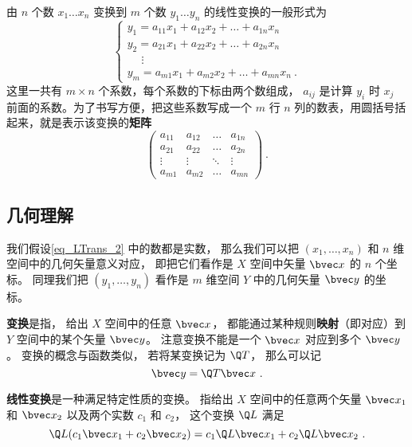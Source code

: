 由 $n$ 个数 $x_1 \ldots x_n$ 变换到 $m$ 个数 $y_1 \ldots y_n$ 的线性变换的一般形式为
\begin{equation}\label{eq_LTrans_2}
\begin{cases}
y_1 = a_{11} x_1 + a_{12} x_2 + \ldots + a_{1n} x_n\\
y_2 = a_{21} x_1 + a_{22} x_2 + \ldots + a_{2n} x_n\\
\quad\; \vdots \\
y_m = a_{m1} x_1 + a_{m2} x_2 + \ldots + a_{mn} x_n~.
\end{cases}
\end{equation} 
这里一共有 $m \times n$ 个系数，每个系数的下标由两个数组成， $a_{ij}$ 是计算 $y_i$ 时 $x_j$ 前面的系数。为了书写方便，把这些系数写成一个 $m$ 行 $n$ 列的数表，用圆括号括起来，就是表示该变换的\textbf{矩阵}
\begin{equation}\begin{pmatrix}
a_{11} & a_{12} & \ldots & a_{1n}\\
a_{21} & a_{22} & \ldots & a_{2n}\\
 \vdots & \vdots & \ddots & \vdots \\
a_{m1} & a_{m2} & \ldots & a_{mn}
\end{pmatrix}~.
\end{equation} 

\subsection{几何理解}

我们假设\autoref{eq_LTrans_2} 中的数都是实数， 那么我们可以把 $(x_1, \dots, x_n)$ 和 $n$ 维空间中的几何矢量意义对应， 即把它们看作是 $X$ 空间中矢量 $\bvec x$ 的 $n$ 个坐标。 同理我们把 $(y_1, \dots, y_n)$ 看作是 $m$ 维空间 $Y$ 中的几何矢量 $\bvec y$ 的坐标。

\textbf{变换}是指， 给出 $X$ 空间中的任意 $\bvec x$， 都能通过某种规则\textbf{映射}（即对应）到 $Y$ 空间中的某个矢量 $\bvec y$。 注意变换不能是一个 $\bvec x$ 对应到多个 $\bvec y$。 变换的概念与函数类似， 若将某变换记为 $\Q T$， 那么可以记
\begin{equation}
\bvec y = \Q T\bvec x~.
\end{equation}

\textbf{线性变换}是一种满足特定性质的变换。 指给出 $X$ 空间中的任意两个矢量 $\bvec x_1$ 和 $\bvec x_2$ 以及两个实数 $c_1$ 和 $c_2$， 这个变换 $\Q L$ 满足
\begin{equation}
\Q L(c_1 \bvec x_1 + c_2 \bvec x_2) = c_1 \Q L \bvec x_1 + c_2 \Q L \bvec x_2~.
\end{equation}

